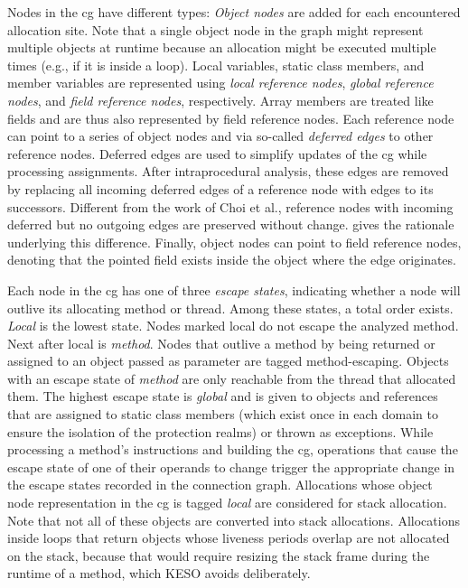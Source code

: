 			Nodes in the \gls{cg} have different types: \emph{Object nodes} are added for each encountered allocation site.
			Note that a single object node in the graph might represent multiple objects at runtime because an allocation
			might be executed multiple times (e.g., if it is inside a loop). Local variables, static class members, and member
			variables are represented using \emph{local reference nodes}, \emph{global reference nodes}, and \emph{field
			reference nodes}, respectively. Array members are treated like fields and are thus also represented by field
			reference nodes. Each reference node can point to a series of object nodes and via so-called \emph{deferred edges}
			to other reference nodes. Deferred edges are used to simplify updates of the \gls{cg} while processing
			assignments. After intraprocedural analysis, these edges are removed by replacing all incoming deferred edges of
			a reference node with edges to its successors. Different from the work of Choi et al., reference nodes with
			incoming deferred but no outgoing edges are preserved without change.  gives the
			rationale underlying this difference. Finally, object nodes can point to field reference nodes, denoting that the
			pointed field exists inside the object where the edge originates.

			Each node in the \gls{cg} has one of three \emph{escape states}, indicating whether a node will outlive its
			allocating method or thread. Among these states, a total order exists. \emph{Local} is the lowest state. Nodes
			marked local do not escape the analyzed method. Next after local is \emph{method}. Nodes that outlive a method by
			being returned or assigned to an object passed as parameter are tagged method-escaping. Objects with an escape
			state of \emph{method} are only reachable from the thread that allocated them. The highest escape state is
			\emph{global} and is given to objects and references that are assigned to static class members (which exist once
			in each domain to ensure the isolation of the protection realms) or thrown as exceptions. While processing
			a method's instructions and building the \gls{cg}, operations that cause the escape state of one of their operands
			to change trigger the appropriate change in the escape states recorded in the connection graph. Allocations whose
			object node representation in the \gls{cg} is tagged \emph{local} are considered for stack allocation. Note that
			not all of these objects are converted into stack allocations. Allocations inside loops that return objects whose
			liveness periods overlap are not allocated on the stack, because that would require resizing the stack frame
			during the runtime of a method, which KESO avoids deliberately.


